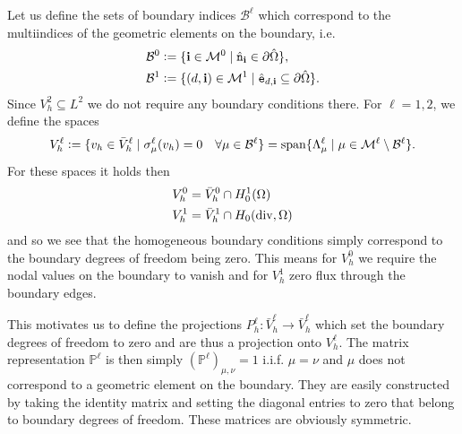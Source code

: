 \documentclass[../master_thesis.tex]{subfiles}
\begin{document}
Let us define the sets of boundary indices $\mathcal{B}^\ell$ which correspond 
to the multiindices of the geometric elements on the boundary, i.e. 
\begin{align*}
    \mathcal{B}^0 &\vcentcolon= \{ \mathbf{i} \in \mathcal{M}^0 
        \mid \hat{\mathtt{n}}_\mathbf{i} \in \partial \hat{\Omega} \},
    \\ \mathcal{B}^1 &\vcentcolon= \{ (d,\mathbf{i}) \in \mathcal{M}^1 
        \mid \hat{\mathtt{e}}_{d,\mathbf{i}} \subseteq \partial \hat{\Omega} \}.
\end{align*}
Since $V_h^2 \subseteq L^2$ we do not require any boundary conditions there.
For $\ell = 1,2$, we define the spaces 
\begin{align*}
    V_h^\ell \vcentcolon= \{ v_h \in \bar{V}_h^\ell \mid \sigma^\ell_\mu (v_h) = 0 
        \quad \forall \mu \in \mathcal{B}^\ell \}
    = \operatorname{span} \{ \Lambda^\ell_\mu \mid \mu \in \mathcal{M}^\ell \setminus \mathcal{B}^\ell \}.
\end{align*}
For these spaces it holds then
\begin{align*}
    V_h^0 &= \bar{V}_h^0 \cap H^1_0(\Omega)
    \\ V_h^1 &= \bar{V}_h^1 \cap H_0(\operatorname{div},\Omega)
\end{align*}
and so we see that the homogeneous boundary conditions simply correspond to the 
boundary degrees of freedom being zero. This means for $V_h^0$ we require the 
nodal values on the boundary to vanish and for $V_h^1$ zero flux through the boundary edges.

This motivates us to define the 
projections $P_h^\ell: \bar{V}_h^\ell \rightarrow \bar{V}_h^\ell$ which set 
the boundary degrees of freedom to zero and are thus 
a projection onto $V_h^\ell$. The
matrix representation $\mathbb{P}^\ell$ is then simply
$(\mathbb{P}^\ell)_{\mu, \nu} = 1 $ i.i.f. $\mu = \nu$ and $\mu$ does not 
correspond to a geometric element on the boundary. 
They are easily constructed 
by taking the identity matrix and setting the diagonal entries to zero that 
belong to boundary degrees of freedom. These matrices are obviously symmetric.
\end{document}
